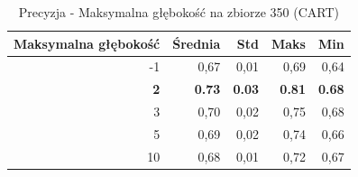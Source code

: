 \begin{table}[htbp]
\centering
\small
\setlength{\tabcolsep}{6pt}
\renewcommand{\arraystretch}{1.2}
\caption{Precyzja - Maksymalna głębokość na zbiorze 350 (CART)}
\label{tab:CART_max_depth_350_precision}
\begin{tabular}{r|r|r|r|r}
\toprule
Maksymalna głębokość & Średnia & Std & Maks & Min \\
\hline
-1 & 0,67 & 0,01 & 0,69 & 0,64 \\
\textbf{2} & \textbf{0.73} & \textbf{0.03} & \textbf{0.81} & \textbf{0.68} \\
3 & 0,70 & 0,02 & 0,75 & 0,68 \\
5 & 0,69 & 0,02 & 0,74 & 0,66 \\
10 & 0,68 & 0,01 & 0,72 & 0,67 \\
\bottomrule
\end{tabular}
\end{table}